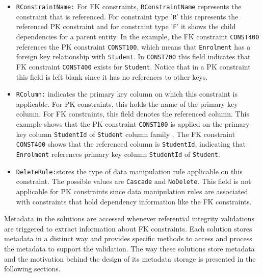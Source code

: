 \begin{itemize}
  \item \texttt{RConstraintName:} For \ac{FK}
  constraints, \texttt{RConstraintName} represents the constraint that is
  referenced. For constraint type '\texttt{R}' this represents the referenced
  \ac{PK} constraint and for constraint type '\texttt{F}' it shows  the child
  dependencies for a parent entity. In the example, the \ac{FK} constraint
  \texttt{CONST400} references the \ac{PK} constraint \texttt{CONST100},  which
  means that \texttt{Enrolment} has a foreign key relationship with
  \texttt{Student}.
   In \texttt{CONST700} this field indicates that \ac{FK} constraint
   \texttt{CONST400} exists for \texttt{Student}. Notice that in a \ac{PK}
   constraint this field is left blank since it has no references to other keys.
  
  \item \texttt{RColumn:}  indicates the primary key column on which this
  constraint is applicable.  For \ac{PK} constraints,  this holds the name of
  the primary key column. For \ac{FK} constraints, this field denotes
  the referenced column.  This example shows that the \ac{PK} constraint
  \texttt{CONST100} is applied on the primary key column \texttt{StudentId} of
  \texttt{Student} column family . The \ac{FK} constraint \texttt{CONST400}
  shows that the referenced column is \texttt{StudentId},  indicating that
  \texttt{Enrolment} references  primary key column \texttt{StudentId} of
  \texttt{Student}.
  
  \item \texttt{DeleteRule:}stores the type of data manipulation rule applicable
  on this constraint. The possible values are  \texttt{Cascade} and
  \texttt{NoDelete}.  This field is not applicable  for \ac{PK} constraints
   since data manipulation rules are associated with constraints that hold
  dependency information like the \ac{FK} constraints.
  
\end{itemize}

Metadata in the solutions are accessed whenever referential integrity
validations are triggered to extract information about \ac{FK} constraints. 
Each solution stores metadata in a distinct way and provides specific methods to
access and process the metadata to support the validation. The way these
solutions store metadata and the motivation behind the design of its metadata
storage is presented in the following sections.

